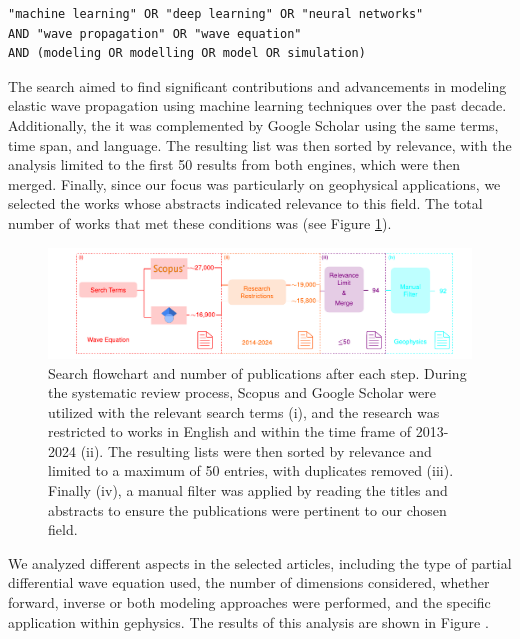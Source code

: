 \documentclass{tufte-handout}
\begin{document}
\begin{verbatim}
"machine learning" OR "deep learning" OR "neural networks" 
AND "wave propagation" OR "wave equation" 
AND (modeling OR modelling OR model OR simulation)
\end{verbatim}

The search aimed to find significant contributions and advancements in modeling elastic wave propagation using machine learning techniques over the past decade. Additionally, the it was complemented by Google Scholar using the same terms, time span, and language. The resulting list was then sorted by relevance, with the analysis limited to the first 50 results from both engines, which were then merged. Finally, since our focus was particularly on geophysical applications, we selected the works whose abstracts indicated relevance to this field. The total number of works that met these conditions was  (see Figure \ref{fig:Escheme_Systematic_Review}).

\begin{figure}
    \includegraphics{figs/Escheme_Systematic_Review.pdf}
\caption{Search flowchart and number of publications after each step. During the systematic review process, Scopus and Google Scholar were utilized with the relevant search terms (i), and the research was restricted to works in English and within the time frame of 2013-2024 (ii). The resulting lists were then sorted by relevance and limited to a maximum of 50 entries, with duplicates removed (iii). Finally (iv), a manual filter was applied by reading the titles and abstracts to ensure the publications were pertinent to our chosen field.}
    \label{fig:Escheme_Systematic_Review}
\end{figure}


We analyzed different aspects in the selected articles, including the type of partial differential wave equation used, the number of dimensions considered, whether forward, inverse or both modeling approaches were performed, and the specific application within gephysics. The results of this analysis are shown in Figure  .
\end{document}
